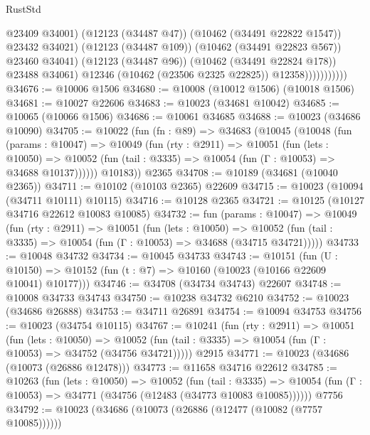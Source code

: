 \begin{lexlean}{RustStd}
\begin{coremodule}
                                  @23409
                                  @34001)
                                (@12123 (@34487 @47))
                                (@10462 (@34491 @22822 @1547))
                                @23432
                                @34021)
                              (@12123 (@34487 @109))
                              (@10462 (@34491 @22823 @567))
                              @23460
                              @34041)
                            (@12123 (@34487 @96))
                            (@10462 (@34491 @22824 @178))
                            @23488
                            @34061)
                          @12346
                          (@10462 (@23506 @2325 @22825))
                          @12358)))))))))))
@34676 := @10006 @1506
@34680 := @10008 (@10012 @1506) (@10018 @1506)
@34681 := @10027 @22606
@34683 := @10023 (@34681 @10042)
@34685 := @10065 (@10066 @1506)
@34686 := @10061 @34685
@34688 := @10023 (@34686 @10090)
@34705 := @10022
    (fun (fn : @89) =>
    @34683
      (@10045
        (@10048
          (fun (params : @10047) =>
          @10049
            (fun (rty : @2911) =>
            @10051
              (fun (lets : @10050) =>
              @10052 (fun (tail : @3335) => @10054 (fun (Γ : @10053) => @34688 @10137))))))
        @10183))
    @2365
@34708 := @10189 (@34681 (@10040 @2365))
@34711 := @10102 (@10103 @2365) @22609
@34715 := @10023 (@10094 (@34711 @10111) @10115)
@34716 := @10128 @2365
@34721 := @10125 (@10127 @34716 @22612 @10083 @10085)
@34732 := fun (params : @10047) =>
  @10049
    (fun (rty : @2911) =>
    @10051
      (fun (lets : @10050) =>
      @10052 (fun (tail : @3335) => @10054 (fun (Γ : @10053) => @34688 (@34715 @34721)))))
@34733 := @10048 @34732
@34734 := @10045 @34733
@34743 := @10151
    (fun (U : @10150) => @10152 (fun (t : @7) => @10160 (@10023 (@10166 @22609 @10041) @10177)))
@34746 := @34708 (@34734 @34743) @22607
@34748 := @10008 @34733 @34743
@34750 := @10238 @34732 @6210
@34752 := @10023 (@34686 @26888)
@34753 := @34711 @26891
@34754 := @10094 @34753
@34756 := @10023 (@34754 @10115)
@34767 := @10241
    (fun (rty : @2911) =>
    @10051
      (fun (lets : @10050) =>
      @10052 (fun (tail : @3335) => @10054 (fun (Γ : @10053) => @34752 (@34756 @34721)))))
    @2915
@34771 := @10023 (@34686 (@10073 (@26886 @12478)))
@34773 := @11658 @34716 @22612
@34785 := @10263
    (fun (lets : @10050) =>
    @10052
      (fun (tail : @3335) =>
      @10054 (fun (Γ : @10053) => @34771 (@34756 (@12483 (@34773 @10083 @10085))))))
    @7756
@34792 := @10023 (@34686 (@10073 (@26886 (@12477 (@10082 (@7757 @10085))))))

\end{coremodule}
\end{lexlean}

